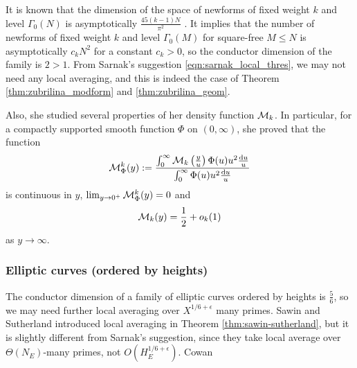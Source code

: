 It is known that the dimension of the space of newforms of fixed weight $k$ and level $\Gamma_0(N)$ is asymptotically $\frac{45(k-1)N}{\pi^2}$ \cite[Theorem 8]{martin2005dimensions}.
It implies that the number of newforms of fixed weight $k$ and level $\Gamma_0(M)$ for square-free $M \le N$ is asymptotically $c_k N^2$ for a constant $c_k > 0$, so the conductor dimension of the family is $2 > 1$.
From Sarnak's suggestion \eqref{eqn:sarnak_local_thres}, we may not need any local averaging, and this is indeed the case of Theorem \ref{thm:zubrilina_modform} and \ref{thm:zubrilina_geom}.

Also, she studied several properties of her density function $\mathcal{M}_k$.
In particular, for a compactly supported smooth function $\Phi$ on $(0, \infty)$, she proved that the function
\begin{equation}
    \mathcal{M}_{\Phi}^k(y) := \frac{\int_0^\infty \mathcal{M}_k\left(\frac{y}{u}\right) \Phi(u) u^2 \frac{\mathrm{d} u}{u}}{\int_0^\infty \Phi(u) u^2 \frac{\mathrm{d} u}{u}}
\end{equation}
is continuous in $y$, $\lim_{y \to 0^+} \mathcal{M}_{\Phi}^k(y) = 0$ and
\[
\mathcal{M}_k(y) = \frac{1}{2} + o_k(1)
\]
as $y \to \infty$.

\subsubsection{Elliptic curves (ordered by heights)}

The conductor dimension of a family of elliptic curves ordered by heights is $\frac{5}{6}$, so we may need further local averaging over $X^{1/6 + \epsilon}$ many primes.
Sawin and Sutherland introduced local averaging in Theorem \ref{thm:sawin-sutherland}, but it is slightly different from Sarnak's suggestion, since they take local average over $\Theta(N_E)$-many primes, not $O(H_E^{1/6 + \epsilon})$.
\ber Cowan \cite{cowan2024murmurations}\er